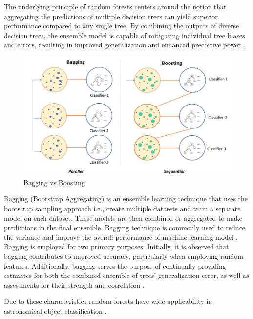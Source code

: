 The underlying principle of random forests centers around the notion that aggregating the predictions of multiple decision trees can yield superior performance compared to any single tree. By combining the outputs of diverse decision trees, the ensemble model is capable of mitigating individual tree biases and errors, resulting in improved generalization and enhanced predictive power \citep{RandomForest1995}.
\begin{figure}[H]
    \centering
    \includegraphics[scale=0.4]{images/bagging vs boosting.png}
    \caption{Bagging vs Boosting \citep{singhal2020a}}
    \label{fig:baggingvsboosting}
\end{figure}
Bagging (Bootstrap Aggregating) is an ensemble learning technique that uses the bootstrap sampling approach i.e., create multiple datasets and train a separate model on each dataset. These models are then combined or aggregated to make predictions in the final ensemble. Bagging technique is commonly used to reduce the variance and improve the overall performance of machine learning model \citep{Breiman2001}. Bagging is employed for two primary purposes. Initially, it is observed that bagging contributes to improved accuracy, particularly when employing random features. Additionally, bagging serves the purpose of continually providing estimates for both the combined ensemble of trees' generalization error, as well as assessments for their strength and correlation \citep{Breiman2001}.

Due to these characteristics random forests have wide applicability in astronomical object classification \citep{Becker2020}.


